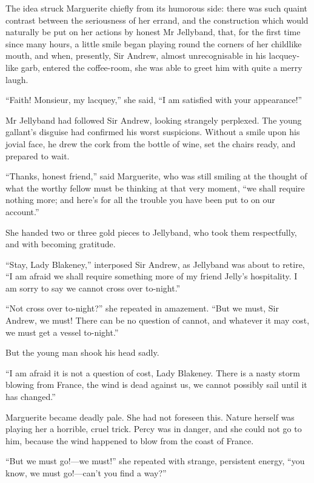 The idea struck Marguerite chiefly from its humorous side: there was such quaint contrast between the seriousness of her errand, and the construction which would naturally be put on her actions by honest Mr Jellyband, that, for the first time since many hours, a little smile began playing round the corners of her childlike mouth, and when, presently, Sir Andrew, almost unrecognisable in his lacquey-like garb, entered the coffee-room, she was able to greet him with quite a merry laugh.

\enquote{Faith! Monsieur, my lacquey,} she said, \enquote{I am satisfied with your appearance!}

Mr Jellyband had followed Sir Andrew, looking strangely perplexed. The young gallant's disguise had confirmed his worst suspicions. With\-out a smile upon his jovial face, he drew the cork from the bottle of wine, set the chairs ready, and prepared to wait.

\enquote{Thanks, honest friend,} said Marguerite, who was still smiling at the thought of what the worthy fellow must be thinking at that very moment, \enquote{we shall require nothing more; and here's for all the trouble you have been put to on our account.}

She handed two or three gold pieces to Jellyband, who took them respectfully, and with becoming gratitude.

\enquote{Stay, Lady Blakeney,} interposed Sir Andrew, as Jellyband was about to retire, \enquote{I am afraid we shall require something more of my friend Jelly's hospitality. I am sorry to say we cannot cross over to-night.}

\enquote{Not cross over to-night?} she repeated in amazement. \enquote{But we must, Sir Andrew, we must! There can be no question of cannot, and whatever it may cost, we must get a vessel to-night.}

But the young man shook his head sadly.

\enquote{I am afraid it is not a question of cost, Lady Blakeney. There is a nasty storm blowing from France, the wind is dead against us, we cannot possibly sail until it has changed.}

Marguerite became deadly pale. She had not foreseen this. Nature herself was playing her a horrible, cruel trick. Percy was in danger, and she could not go to him, because the wind happened to blow from the coast of France.

\enquote{But we must go!---we must!} she repeated with strange, persistent energy, \enquote{you know, we must go!---can't you find a way?}

